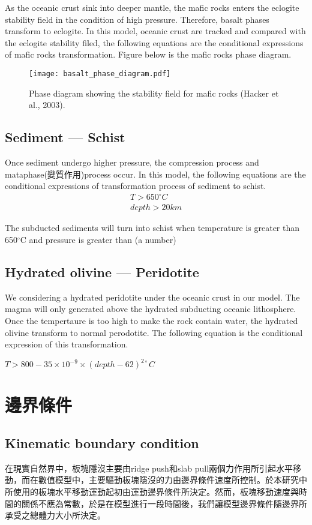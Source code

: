 As the oceanic crust sink into deeper mantle, the mafic rocks enters the eclogite stability field in the condition of high pressure. 
Therefore, basalt phases transform to eclogite.  
In this model, oceanic crust are tracked and compared with the eclogite stability filed, the following equations are the conditional expressions of mafic rocks transformation. 
Figure below is the mafic rocks phase diagram.
\begin{figure*}[ht!]
    \centering
    \texttt{[image: basalt\_phase\_diagram.pdf]}
    \caption{ Phase diagram showing the stability field for mafic rocks (Hacker et al., 2003).  }
    \label{fig:elastic}
\end{figure*}

\subsection{Sediment --- Schist}

Once sediment undergo higher pressure, the compression process and mataphase(變質作用)process occur.
In this model, the following equations are the conditional expressions of transformation process of sediment to schist.
\begin{align}
T > 650^{\circ} C\\
depth >  20 km 
\end{align}

The subducted sediments will turn into schist when temperature is greater than 650$^\circ$C and pressure is greater than (a number)

\subsection{Hydrated olivine --- Peridotite}

We considering a hydrated peridotite under the oceanic crust in our model. 
The magma will only generated above the hydrated subducting oceanic lithosphere.
Once the tempertaure is too high to make the rock contain water, the hydrated olivine transform to normal perodotite.
The following equation is the conditional expression of this transformation.

$T > 800-35\times 10^{-9}\times (depth-62)^{2\circ}C$

\section{邊界條件}

\subsection{Kinematic boundary condition}
在現實自然界中，板塊隱沒主要由ridge push和slab pull兩個力作用所引起水平移動，而在數值模型中，主要驅動板塊隱沒的力由邊界條件速度所控制。於本研究中所使用的板塊水平移動運動起初由運動邊界條件所決定。然而，板塊移動速度與時間的關係不應為常數，於是在模型進行一段時間後，我們讓模型邊界條件隨邊界所承受之總體力大小所決定。

